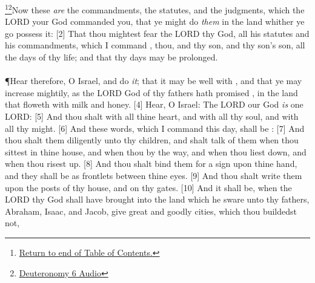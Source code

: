 \footnote{\textcolor[cmyk]{0.99998,1,0,0}{\hyperlink{TOC}{Return to end of Table of Contents.}}}\footnote{\href{https://audiobible.com/bible/deuteronomy_6.html}{\textcolor[cmyk]{0.99998,1,0,0}{Deuteronomy 6 Audio}}}\textcolor[cmyk]{0.99998,1,0,0}{Now these \emph{are} the commandments, the statutes, and the judgments, which the LORD your God commanded   you, that ye might do \emph{them} in the land whither ye go  possess it:}
[2] \textcolor[cmyk]{0.99998,1,0,0}{That thou mightest fear the LORD thy God,   all his statutes and his commandments, which I command  , thou, and thy son, and thy son's son, all the days of thy life; and that thy days may be prolonged.}\\
\\
\P \textcolor[cmyk]{0.99998,1,0,0}{Hear therefore, O Israel, and   do \emph{it}; that it may be well with  , and that ye may increase mightily, as the LORD God of thy fathers hath promised  , in the land that floweth with milk and honey.}
[4] \textcolor[cmyk]{0.99998,1,0,0}{Hear, O Israel: The LORD our God \emph{is} one LORD:}
[5] \textcolor[cmyk]{0.99998,1,0,0}{And thou shalt  with all thine heart, and with all thy soul, and with all thy might.}
[6] \textcolor[cmyk]{0.99998,1,0,0}{And these words, which I command   this day, shall be :}
[7] \textcolor[cmyk]{0.99998,1,0,0}{And thou shalt  them diligently unto thy children, and shalt talk of them when thou sittest in thine house, and when thou  by the way, and when thou liest down, and when thou risest up.}
[8] \textcolor[cmyk]{0.99998,1,0,0}{And thou shalt bind them for a sign upon thine hand, and they shall be as frontlets between thine eyes.}
[9] \textcolor[cmyk]{0.99998,1,0,0}{And thou shalt write them upon the posts of thy house, and on thy gates.}
[10] \textcolor[cmyk]{0.99998,1,0,0}{And it shall be, when the LORD thy God shall have brought   into the land which he sware unto thy fathers,  Abraham,  Isaac, and  Jacob,  give   great and goodly cities, which thou buildedst not,}
